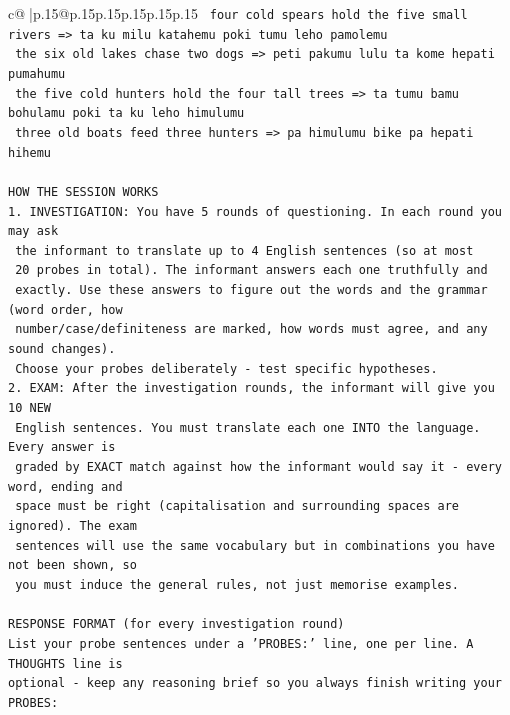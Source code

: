 \documentclass{article}
\begin{document}
{\begin{supertabular}{c@{$\;$}|p{.15\linewidth}@{}p{.15\linewidth}p{.15\linewidth}p{.15\linewidth}p{.15\linewidth}p{.15\linewidth}}
{{{\texttt{    four cold spears hold the five small rivers  =>  ta ku milu katahemu poki tumu leho pamolemu} \\
\texttt{    the six old lakes chase two dogs  =>  peti pakumu lulu ta kome hepati pumahumu} \\
\texttt{    the five cold hunters hold the four tall trees  =>  ta tumu bamu bohulamu poki ta ku leho himulumu} \\
\texttt{    three old boats feed three hunters  =>  pa himulumu bike pa hepati hihemu} \\
\\ 
\texttt{HOW THE SESSION WORKS} \\
\texttt{1. INVESTIGATION: You have 5 rounds of questioning. In each round you may ask} \\
\texttt{   the informant to translate up to 4 English sentences (so at most} \\
\texttt{   20 probes in total). The informant answers each one truthfully and} \\
\texttt{   exactly. Use these answers to figure out the words and the grammar (word order, how} \\
\texttt{   number/case/definiteness are marked, how words must agree, and any sound changes).} \\
\texttt{   Choose your probes deliberately {-} test specific hypotheses.} \\
\texttt{2. EXAM: After the investigation rounds, the informant will give you 10 NEW} \\
\texttt{   English sentences. You must translate each one INTO the language. Every answer is} \\
\texttt{   graded by EXACT match against how the informant would say it {-} every word, ending and} \\
\texttt{   space must be right (capitalisation and surrounding spaces are ignored). The exam} \\
\texttt{   sentences will use the same vocabulary but in combinations you have not been shown, so} \\
\texttt{   you must induce the general rules, not just memorise examples.} \\
\\ 
\texttt{RESPONSE FORMAT (for every investigation round)} \\
\texttt{List your probe sentences under a 'PROBES:' line, one per line. A THOUGHTS line is} \\
\texttt{optional {-} keep any reasoning brief so you always finish writing your PROBES:} \\
}}}
\end{supertabular}}
\end{document}
